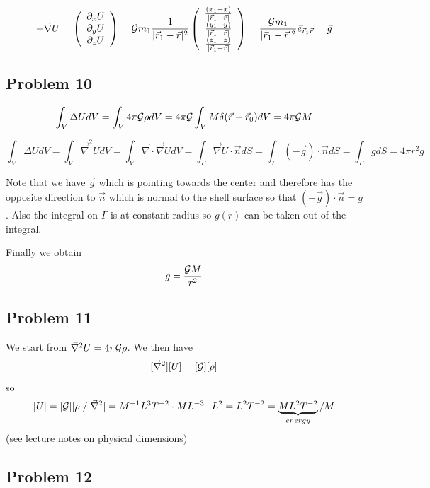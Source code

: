 \[
-\vec\nabla U = 
\left(
\begin{array}{c}
\partial_x U \\
\partial_y U \\
\partial_z U 
\end{array}
\right)
=  {\cal G} m_1  \frac{1}{|\vec{r}_1 - \vec{r}|^2} 
\left(
\begin{array}{c}
\frac{(x_1-x)}{|\vec{r}_1 - \vec{r}|} \\
\frac{(y_1-y)}{|\vec{r}_1 - \vec{r}|} \\
\frac{(z_1-z)}{|\vec{r}_1 - \vec{r}|} \\
\end{array}
\right)
=
\frac{ {\cal G} m_1}{|\vec{r}_1 - \vec{r}|^2} \vec{e}_{\vec{r}_1\vec{r}} = \vec{g}
\]


\subsection{Problem 10}

\[
\int_V \Delta U dV
=
\int_V 4\pi {\cal G} \rho dV
=
4\pi {\cal G} \int_V M \delta(\vec{r}-\vec{r}_0) dV
=
4 \pi {\cal G} M
\] 


\[
\int_V \Delta U dV 
=
\int_V \vec\nabla^2 U dV
=
\int_V \vec\nabla \cdot \vec\nabla U dV
=
\int_\Gamma \vec\nabla U \cdot \vec n dS
=
\int_\Gamma ( - \vec{g}) \cdot \vec n dS
=
\int_\Gamma g  dS
=
4\pi r^2 g
\]

Note that we have $\vec{g}$ which is pointing towards the center and therefore has the 
opposite direction to $\vec{n}$ which is normal to the shell surface so that $( - \vec{g}) \cdot \vec n = g$.
Also the integral on $\Gamma$ is at constant radius so $g(r)$ can be taken out of the integral.

Finally we obtain 
\[
g = \frac{{\cal G} M}{r^2}
\]

\subsection{Problem 11}

We start from  $ \vec\nabla^2 U = 4\pi {\cal G}\rho $.
We then have 
\[
[\vec\nabla^2] [U] = [{\cal G}][\rho ]
\]
so 
\[
[U]=  [{\cal G}][\rho ] / [\vec\nabla^2]
= M^{-1} L^3 T^{-2} \cdot M L^{-3} \cdot L^2
= L^2 T^{-2} 
= \underbrace{ML^2 T^{-2}}_{energy} / M 
\]
(see lecture notes on physical dimensions)

\subsection{Problem 12}

